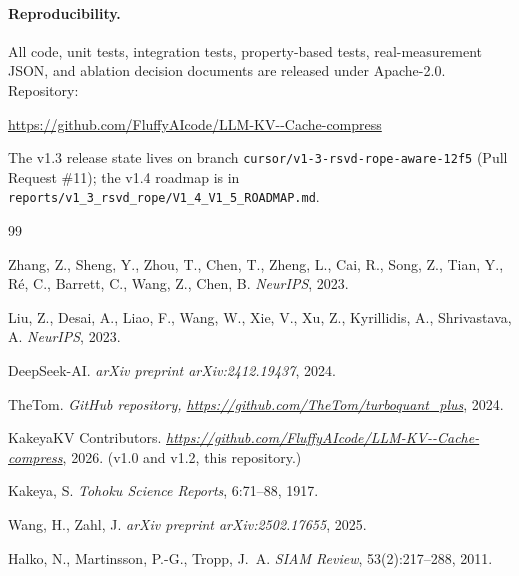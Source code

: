 \documentclass[11pt,a4paper]{article}
\theoremstyle{definition}
\theoremstyle{plain}
\begin{document}
\paragraph{Reproducibility.} All code, unit tests, integration tests, property-based tests, real-measurement JSON, and ablation decision documents are released under Apache-2.0. Repository:
\begin{center}
\url{https://github.com/FluffyAIcode/LLM-KV--Cache-compress}
\end{center}
The v1.3 release state lives on branch \texttt{cursor/v1-3-rsvd-rope-aware-12f5} (Pull Request \#11); the v1.4 roadmap is in \texttt{reports/v1\_3\_rsvd\_rope/V1\_4\_V1\_5\_ROADMAP.md}.

\begin{thebibliography}{99}

Zhang, Z., Sheng, Y., Zhou, T., Chen, T., Zheng, L., Cai, R., Song, Z., Tian, Y., R\'e, C., Barrett, C., Wang, Z., Chen, B.
\newblock \emph{NeurIPS}, 2023.

Liu, Z., Desai, A., Liao, F., Wang, W., Xie, V., Xu, Z., Kyrillidis, A., Shrivastava, A.
\newblock \emph{NeurIPS}, 2023.

DeepSeek-AI.
\newblock \emph{arXiv preprint arXiv:2412.19437}, 2024.

TheTom.
\newblock \emph{GitHub repository, \url{https://github.com/TheTom/turboquant_plus}}, 2024.

KakeyaKV Contributors.
\newblock \emph{\url{https://github.com/FluffyAIcode/LLM-KV--Cache-compress}}, 2026. (v1.0 and v1.2, this repository.)

Kakeya, S.
\newblock \emph{Tohoku Science Reports}, 6:71--88, 1917.

Wang, H., Zahl, J.
\newblock \emph{arXiv preprint arXiv:2502.17655}, 2025.

Halko, N., Martinsson, P.-G., Tropp, J.~A.
\newblock \emph{SIAM Review}, 53(2):217--288, 2011.


\end{thebibliography}
\end{document}
